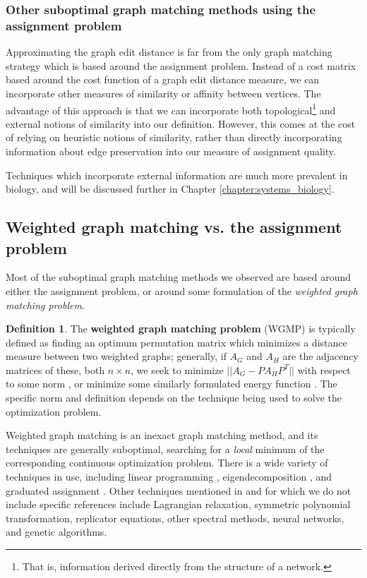 \documentclass[12pt]{thesis}
\theoremstyle{plain}
\theoremstyle{definition}
\newtheorem{definition}[theorem]{Definition}
\theoremstyle{remark}
\begin{document}
\subsubsection{Other suboptimal graph matching methods using the assignment problem}

Approximating the graph edit distance is far from the only graph matching strategy which is based around the assignment problem. Instead of a cost matrix based around the cost function of a graph edit distance measure, we can incorporate other measures of similarity or affinity between vertices. The advantage of this approach is that we can incorporate both topological\footnote{That is, information derived directly from the structure of a network.} and external notions of similarity into our definition. However, this comes at the cost of relying on heuristic notions of similarity, rather than directly incorporating information about edge preservation into our measure of assignment quality. 

Techniques which incorporate external information are much more prevalent in biology, and will be discussed further in Chapter \ref{chapter:systems_biology}.

\subsection{Weighted graph matching vs. the assignment problem}

Most of the suboptimal graph matching methods we observed are based around either the assignment problem, or around some formulation of the \textit{weighted graph matching problem}.

\begin{definition}
The \textbf{weighted graph matching problem} (WGMP) is typically defined as finding an optimum permutation matrix which minimizes a distance measure between two weighted graphs; generally, if $A_G$ and $A_H$ are the adjacency matrices of these, both $n\times n$, we seek to minimize $||A_G - PA_HP^T||$ with respect to some norm\cite{Umeyama_1988, Koutra_2013, Almohamad_1993} , or minimize some similarly formulated energy function \cite{Gold_1996}. The specific norm and definition depends on the technique being used to solve the optimization problem.
\end{definition}

Weighted graph matching is an inexact graph matching method, and its techniques are generally suboptimal, searching for a \textit{local} minimum of the corresponding continuous optimization problem. There is a wide variety of techniques in use, including linear programming \cite{Almohamad_1993}, eigendecomposition \cite{Umeyama_1988}, and graduated assignment \cite{Gold_1996}. Other techniques mentioned in \cite{Almohamad_1993, Umeyama_1988, Gold_1996} and \cite{Conte_2004} for which we do not include specific references include Lagrangian relaxation, symmetric polynomial transformation, replicator equations, other spectral methods, neural networks, and genetic algorithms.
\end{document}
